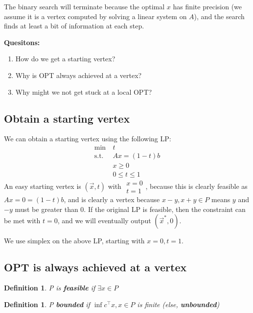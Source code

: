 \documentclass[11pt]{article}
\newtheorem{definition}[theorem]{Definition}
\begin{document}
The binary search will terminate because the optimal $x$ has finite
precision (we assume it is a vertex computed by solving a linear system on $A$),
and the search finds at least a bit of information at each step.

\textbf{Quesitons:}
\begin{enumerate}
\item How do we get a starting vertex?
\item Why is \textsf{OPT} always achieved at a vertex?
\item Why might we not get stuck at a local \textsf{OPT}?
\end{enumerate}

\subsection{Obtain a starting vertex}
We can obtain a starting vertex using the following LP:
\begin{align*}
\min~&t \\
\text{s.t. }& Ax = (1-t)b\\
& x \geq 0\\
& 0 \leq t \leq 1
\end{align*}
An easy starting vertex is $(\vec x, t)$ with
$\begin{aligned} x=0 \\ t=1 \end{aligned}$,
because this is clearly feasible as $Ax = 0 = (1-t)b$,
and is clearly a vertex because $x-y,x+y\in P$ means $y$ and $-y$ must be
greater than 0.
If the original LP is feasible, then the constraint can be met with $t = 0$,
and we will eventually output $(\vec{x}^*,0)$.
            
 We use simplex on the above LP, starting with $x=0, t=1$.
\subsection{\textsf{OPT} is always achieved at a vertex}
  \begin{definition}
    P is \textbf{feasible} if $\exists x \in P$
  \end{definition}
  \begin{definition}
    P \textbf{bounded} if $\inf{c^\top x, x\in P}$ is finite
  (else, \textbf{unbounded})
  \end{definition}
\end{document}
